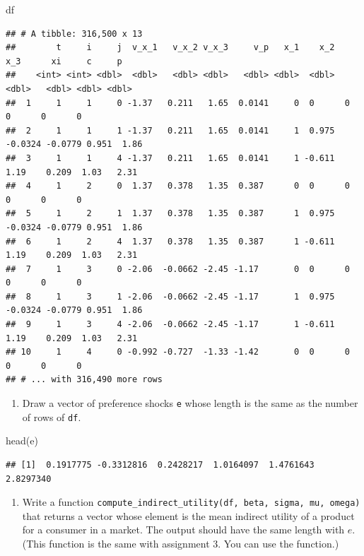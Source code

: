 \documentclass[
]{book}
\newenvironment{Shaded}{\begin{snugshade}}{\end{snugshade}}
\newcommand{\FunctionTok}[1]{\textcolor[rgb]{0.00,0.00,0.00}{#1}}
\newcommand{\NormalTok}[1]{#1}
\providecommand{\tightlist}{%
  \setlength{\itemsep}{0pt}\setlength{\parskip}{0pt}}
\begin{document}
\begin{Shaded}
\begin{Highlighting}[]
\NormalTok{df}
\end{Highlighting}
\end{Shaded}

\begin{verbatim}
## # A tibble: 316,500 x 13
##        t     i     j  v_x_1   v_x_2 v_x_3     v_p   x_1    x_2     x_3      xi     c     p
##    <int> <int> <dbl>  <dbl>   <dbl> <dbl>   <dbl> <dbl>  <dbl>   <dbl>   <dbl> <dbl> <dbl>
##  1     1     1     0 -1.37   0.211   1.65  0.0141     0  0      0       0      0      0   
##  2     1     1     1 -1.37   0.211   1.65  0.0141     1  0.975 -0.0324 -0.0779 0.951  1.86
##  3     1     1     4 -1.37   0.211   1.65  0.0141     1 -0.611  1.19    0.209  1.03   2.31
##  4     1     2     0  1.37   0.378   1.35  0.387      0  0      0       0      0      0   
##  5     1     2     1  1.37   0.378   1.35  0.387      1  0.975 -0.0324 -0.0779 0.951  1.86
##  6     1     2     4  1.37   0.378   1.35  0.387      1 -0.611  1.19    0.209  1.03   2.31
##  7     1     3     0 -2.06  -0.0662 -2.45 -1.17       0  0      0       0      0      0   
##  8     1     3     1 -2.06  -0.0662 -2.45 -1.17       1  0.975 -0.0324 -0.0779 0.951  1.86
##  9     1     3     4 -2.06  -0.0662 -2.45 -1.17       1 -0.611  1.19    0.209  1.03   2.31
## 10     1     4     0 -0.992 -0.727  -1.33 -1.42       0  0      0       0      0      0   
## # ... with 316,490 more rows
\end{verbatim}

\begin{enumerate}
\def\labelenumi{\arabic{enumi}.}
\setcounter{enumi}{5}
\tightlist
\item
  Draw a vector of preference shocks \texttt{e} whose length is the same as the number of rows of \texttt{df}.
\end{enumerate}

\begin{Shaded}
\begin{Highlighting}[]
\FunctionTok{head}\NormalTok{(e)}
\end{Highlighting}
\end{Shaded}

\begin{verbatim}
## [1]  0.1917775 -0.3312816  0.2428217  1.0164097  1.4761643  2.8297340
\end{verbatim}

\begin{enumerate}
\def\labelenumi{\arabic{enumi}.}
\setcounter{enumi}{6}
\tightlist
\item
  Write a function \texttt{compute\_indirect\_utility(df,\ beta,\ sigma,\ mu,\ omega)} that returns a vector whose element is the mean indirect utility of a product for a consumer in a market. The output should have the same length with \(e\). (This function is the same with assignment 3. You can use the function.)
\end{enumerate}
\end{document}
